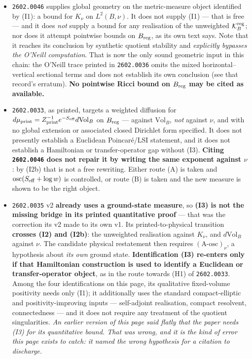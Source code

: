 \documentclass[11pt]{article}
\begin{document}
\begin{itemize}
\item \texttt{2602.0046} supplies global geometry on the metric-measure object
identified by (I1): a bound for $K_\nu$ on $L^2(B,\nu)$. It does not supply (I1) ---
that is free --- and it does \emph{not} supply a bound for any realisation of the
unweighted $\mathcal K_B^{\rm reg}$; nor does it attempt pointwise bounds on
$B_{\rm reg}$, as its own text says. Note that it reaches its conclusion by synthetic
quotient stability and \emph{explicitly bypasses the O'Neill computation}. That is now
the only sound geometric input in this chain: the O'Neill trace printed in
\texttt{2602.0036} omits the mixed horizontal--vertical sectional terms and does not
establish its own conclusion (see that record's erratum). \textbf{No pointwise Ricci
bound on $B_{\rm reg}$ may be cited as available.}
\item \texttt{2602.0033}, as printed, targets a weighted diffusion for
$d\mu_{\rm print}=Z_{\rm print}^{-1}e^{-S_{\rm eff}}d\mathrm{Vol}_B$ on
$B_{\rm reg}$ --- against $\mathrm{Vol}_B$, \emph{not} against $\nu$, and with no
global extension or associated closed Dirichlet form specified. It does not presently
establish a Euclidean Poincar\'e/LSI statement, and it does not establish a
Hamiltonian or transfer-operator gap without (I3). \textbf{Citing \texttt{2602.0046}
does not repair it by writing the same exponent against $\nu$}: by (I2b) that is not a
free rewriting. Either route (A) is taken and
$\operatorname{osc}(S_{\rm eff}+\log w)$ is controlled, or route (B) is taken and the
new measure is shown to be the right object.
\item \texttt{2602.0035} v2 \textbf{already uses a ground-state measure}, so
\textbf{(I3) is not the missing bridge in its printed quantitative proof} --- that was
the correction its v2 made to its own v1. Its printed-to-physical transition
\textbf{crosses (I2) and (I2b)}: the unweighted realisation against $K_\nu$, and
$d\mathrm{Vol}_B$ against $\nu$. The candidate physical restatement then requires
$(\text{A-osc})_\nu$, a hypothesis about \emph{its own} ground state.
\textbf{Identification (I3) re-enters only if that Hamiltonian construction is used to
identify a Euclidean or transfer-operator object}, as in the route towards (H1) of
\texttt{2602.0033}. Among the four identifications on this page, its qualitative
fixed-volume positivity needs only (I1); it additionally uses the standard
compact-elliptic and positivity-improving inputs --- self-adjoint realisation, compact
resolvent, connectedness --- and it does not require any treatment of the quotient
singularities. \emph{An earlier version of this page said flatly that the paper needs
(I3) for its quantitative bound. That was wrong, and it is the kind of error this page
exists to catch: it named the wrong hypothesis for a citation to discharge.}
\end{itemize}
\end{document}
